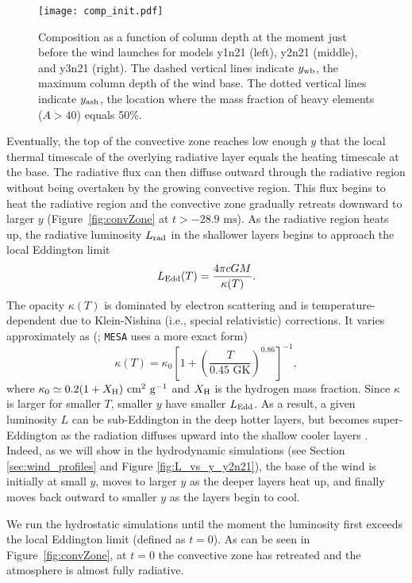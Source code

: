 \documentclass[apj,usenatbib, iop, twocolappendix]{emulateapj}
\newcommand{\Lrad}{L_{\rm rad}}
\newcommand{\beq}{\begin{equation}}
\newcommand{\eeq}{\end{equation}}
\newcommand{\trm}[1]{\textrm{#1}}
\begin{document}
 \begin{figure*}
\texttt{[image: comp\_init.pdf]}
\caption{Composition as a function of column depth at the moment just before the wind launches for models y1n21 (left), y2n21 (middle), and y3n21 (right). The dashed vertical lines indicate $y_{\rm wb}$, the maximum column depth of the wind base.  The dotted vertical lines indicate  $y_{\rm ash}$, the location where the mass fraction of heavy elements ($A>40$) equals 50\%.}
\label{fig:comp_init}
\end{figure*}

Eventually, the top of the convective zone reaches low enough $y$ that the local thermal timescale of the overlying radiative layer equals the heating timescale at the base. The radiative flux can then diffuse outward through the radiative region without being overtaken by the growing convective region.  This flux begins to heat the radiative region and the convective zone gradually retreats downward to larger $y$ (Figure~\ref{fig:convZone} at $t>-28.9\trm{ ms}$).  As the radiative region heats up, the radiative luminosity $\Lrad$ in the shallower layers begins to approach the local Eddington limit
\beq
L_{\rm Edd}(T) = \frac{4\pi c GM}{\kappa(T)}.
\label{eq:Ledd}
\eeq
The opacity $\kappa(T)$ is dominated by electron scattering and is temperature-dependent due to Klein-Nishina (i.e., special relativistic) corrections.  It varies approximately as (\citealt{Paczynski:83}; \texttt{MESA} uses a more exact form)
\beq
\kappa(T)=\kappa_0\left[1+\left(\frac{T}{0.45\trm{ GK}}\right)^{0.86}\right]^{-1},
\label{eq:kappa_vs_T}
\eeq
where $\kappa_0\simeq 0.2 (1+X_{\rm H}) \trm{ cm$^2$ g$^{-1}$}$ and $X_{\rm H}$ is the hydrogen mass fraction.  
Since $\kappa$ is larger for smaller $T$,  smaller $y$ have smaller $L_{\rm Edd}$.  As a result, a given luminosity $L$ can be sub-Eddington in the deep hotter layers, but becomes super-Eddington as the radiation diffuses upward into the shallow cooler layers \citep{Ebisuzaki:83}.  Indeed, as we will show in the hydrodynamic simulations (see Section \ref{sec:wind_profiles} and Figure \ref{fig:L_vs_y_y2n21}), the base of the wind is initially at small $y$, moves to larger $y$ as the deeper layers heat up, and finally moves back outward to smaller $y$ as the layers begin to cool.  

We run the hydrostatic simulations until the moment the luminosity first exceeds the local Eddington limit (defined as $t=0$).  As can be seen in Figure~\ref{fig:convZone}, at $t=0$ the convective zone has retreated and the atmosphere is almost fully radiative.  
\end{document}
